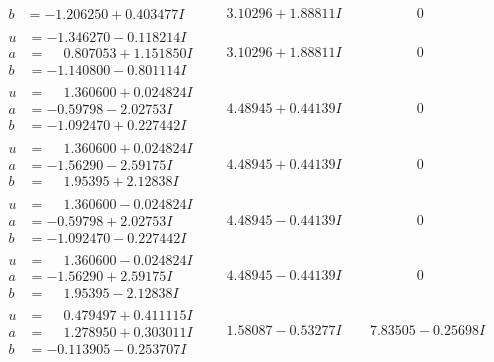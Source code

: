 \documentclass[1p]{elsarticle_modified}
\theoremstyle{definition}
\begin{document}
$$\begin{array}{c|c|c}
\begin{aligned}
b &= -1.206250 + 0.403477 I\end{aligned}
 & \phantom{-}3.10296 + 1.88811 I & \phantom{-0.000000 } 0 \\ \hline\begin{aligned}
u &= -1.346270 - 0.118214 I \\
a &= \phantom{-}0.807053 + 1.151850 I \\
b &= -1.140800 - 0.801114 I\end{aligned}
 & \phantom{-}3.10296 + 1.88811 I & \phantom{-0.000000 } 0 \\ \hline\begin{aligned}
u &= \phantom{-}1.360600 + 0.024824 I \\
a &= -0.59798 - 2.02753 I \\
b &= -1.092470 + 0.227442 I\end{aligned}
 & \phantom{-}4.48945 + 0.44139 I & \phantom{-0.000000 } 0 \\ \hline\begin{aligned}
u &= \phantom{-}1.360600 + 0.024824 I \\
a &= -1.56290 - 2.59175 I \\
b &= \phantom{-}1.95395 + 2.12838 I\end{aligned}
 & \phantom{-}4.48945 + 0.44139 I & \phantom{-0.000000 } 0 \\ \hline\begin{aligned}
u &= \phantom{-}1.360600 - 0.024824 I \\
a &= -0.59798 + 2.02753 I \\
b &= -1.092470 - 0.227442 I\end{aligned}
 & \phantom{-}4.48945 - 0.44139 I & \phantom{-0.000000 } 0 \\ \hline\begin{aligned}
u &= \phantom{-}1.360600 - 0.024824 I \\
a &= -1.56290 + 2.59175 I \\
b &= \phantom{-}1.95395 - 2.12838 I\end{aligned}
 & \phantom{-}4.48945 - 0.44139 I & \phantom{-0.000000 } 0 \\ \hline\begin{aligned}
u &= \phantom{-}0.479497 + 0.411115 I \\
a &= \phantom{-}1.278950 + 0.303011 I \\
b &= -0.113905 - 0.253707 I\end{aligned}
 & \phantom{-}1.58087 - 0.53277 I & \phantom{-}7.83505 - 0.25698 I \\ \hline\begin{aligned}

\end{aligned}
\end{array}$$
\end{document}
